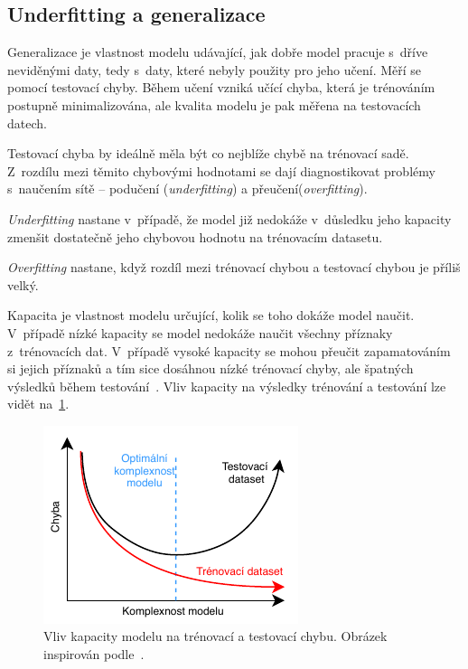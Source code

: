 

\subsection{Underfitting a generalizace}
Generalizace je vlastnost modelu udávající, jak dobře model pracuje s~dříve neviděnými daty, tedy s~daty, které nebyly použity pro jeho učení. Měří se pomocí testovací chyby. Během učení vzniká učící chyba, která je trénováním postupně minimalizována, ale kvalita modelu je pak měřena na testovacích datech. 

Testovací chyba by ideálně měla být co nejblíže chybě na trénovací sadě. Z~rozdílu mezi těmito chybovými hodnotami se dají diagnostikovat problémy s~naučením sítě -- podučení (\textit{underfitting}) a přeučení(\textit{overfitting}).

\textit{Underfitting} nastane v~případě, že model již nedokáže v~důsledku jeho kapacity zmenšit dostatečně jeho chybovou hodnotu na trénovacím datasetu.

\textit{Overfitting} nastane, když rozdíl mezi trénovací chybou a testovací chybou je příliš velký.

Kapacita je vlastnost modelu určující, kolik se toho dokáže model naučit. V~případě nízké kapacity se model nedokáže naučit všechny příznaky z~trénovacích dat. V~případě vysoké kapacity se mohou přeučit zapamatováním si jejich příznaků a tím sice dosáhnou nízké trénovací chyby, ale špatných výsledků během testování~\cite{mitdeeplearning}. Vliv kapacity na výsledky trénování a testování lze vidět na~\ref{fig:capacity}.
\begin{figure}[H]
    \centering
    \includegraphics[scale=1.35]{obrazky-figures/capacity_vs_error.pdf}
    \caption{\label{fig:capacity}Vliv kapacity modelu na trénovací a testovací chybu. Obrázek inspirován podle~\cite{trainingvstesterror}.}
\end{figure}

